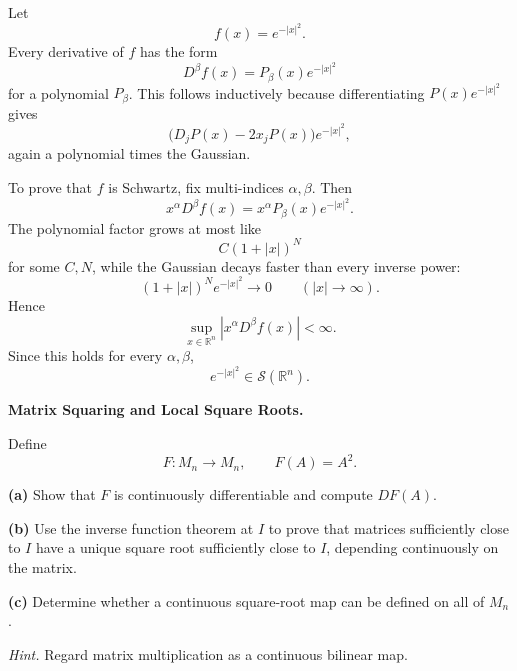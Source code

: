 \begin{solution}
Let
\[
f(x)=e^{-|x|^2}.
\]
Every derivative of \(f\) has the form
\[
D^\beta f(x)=P_\beta(x)e^{-|x|^2}
\]
for a polynomial \(P_\beta\). This follows inductively because differentiating
\(P(x)e^{-|x|^2}\) gives
\[
\bigl(D_jP(x)-2x_jP(x)\bigr)e^{-|x|^2},
\]
again a polynomial times the Gaussian.

To prove that \(f\) is Schwartz, fix multi-indices \(\alpha,\beta\). Then
\[
x^\alpha D^\beta f(x)
=
x^\alpha P_\beta(x)e^{-|x|^2}.
\]
The polynomial factor grows at most like
\[
C(1+|x|)^N
\]
for some \(C,N\), while the Gaussian decays faster than every inverse power:
\[
(1+|x|)^N e^{-|x|^2}\to0
\qquad(|x|\to\infty).
\]
Hence
\[
\sup_{x\in\mathbb R^n}
|x^\alpha D^\beta f(x)|
<
\infty.
\]
Since this holds for every \(\alpha,\beta\),
\[
\boxed{
e^{-|x|^2}\in\mathcal S(\mathbb R^n).
}
\]
\end{solution}


\begin{problem}[CP-II-0059]
\label{prob:cp-ii-0059}
\textbf{Matrix Squaring and Local Square Roots.}

\hspace*{1.5em}Define
\[
F:M_n\to M_n,\qquad F(A)=A^2.
\]

\par\smallskip\noindent\textbf{(a)}\quad
Show that \(F\) is continuously differentiable and compute \(DF(A)\).

\par\smallskip\noindent\textbf{(b)}\quad
Use the inverse function theorem at \(I\) to prove that matrices sufficiently
close to \(I\) have a unique square root sufficiently close to \(I\), depending
continuously on the matrix.

\par\smallskip\noindent\textbf{(c)}\quad
Determine whether a continuous square-root map can be defined on all of \(M_n\).

\emph{Hint.} Regard matrix multiplication as a continuous bilinear map.
\end{problem}


